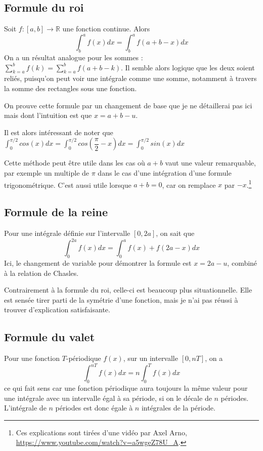 \documentclass[10pt,a4paper]{book}
\newcommand{\R}{\mathbb{R}}
\begin{document}
\subsection{Formule du roi}
Soit $f:[a,b]\to\R$ une fonction continue. Alors 
\[\int^a_b f(x) dx = \int^a_b f(a+b-x) dx\]
On a un résultat analogue pour les sommes : $\sum^b_{k=a} f(k) = \sum^b_{k=a} f(a+b-k)$. Il semble alors logique que les deux soient reliés, puisqu'on peut voir une intégrale comme une somme, notamment à travers la somme des rectangles sous une fonction.\par 
On prouve cette formule par un changement de base que je ne détaillerai pas ici mais dont l'intuition est que $x=a+b-u$.\par 
Il est alors intéressant de noter que $\int^{\pi/2}_0 cos(x)dx = \int^{\pi/2}_0 cos(\dfrac{\pi}{2}-x)dx = \int^{\pi/2}_0 sin(x)dx$\par 
Cette méthode peut être utile dans les cas où $a+b$ vaut une valeur remarquable, par exemple un multiple de $\pi$ dans le cas d'une intégration d'une formule trigonométrique. C'est aussi utile lorsque $a+b=0$, car on remplace $x$ par $-x$.\footnote{Ces explications sont tirées d'une vidéo par Axel Arno, \url{https://www.youtube.com/watch?v=a5wgeZ78U_A}.}

\subsection{Formule de la reine}
Pour une intégrale définie sur l'intervalle $[0,2a]$, on sait que 
\[\int^{2a}_0 f(x)dx = \int^{a}_0 f(x)+f(2a-x)dx \]
Ici, le changement de variable pour démontrer la formule est $x=2a-u$, combiné à la relation de Chasles.\par 
Contrairement à la formule du roi, celle-ci est beaucoup plus situationnelle. Elle est sensée tirer parti de la symétrie d'une fonction, mais je n'ai pas réussi à trouver d'explication satisfaisante.

\subsection{Formule du valet}
Pour une fonction $T$-périodique $f(x)$, sur un intervalle $[0,nT]$, on a
\[\int^{nT}_0 f(x)dx = n\int^T_0 f(x)dx\]
ce qui fait sens car une fonction périodique aura toujours la même valeur pour une intégrale avec un intervalle égal à sa période, si on le décale de $n$ périodes. L'intégrale de $n$ périodes est donc égale à $n$ intégrales de la période.
\end{document}
